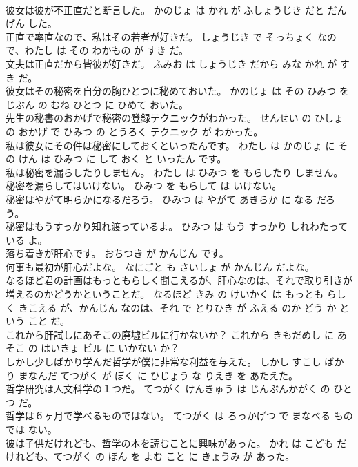 \documentclass[8pt]{extreport}
\begin{document}
\begin{CJK}{UTF8}{min}
\\	彼女は彼が不正直だと断言した。	かのじょ は かれ が ふしょうじき だと だんげん した。	
\\	正直で率直なので、私はその若者が好きだ。	しょうじき で そっちょく なので、わたし は その わかもの が すき だ。	
\\	文夫は正直だから皆彼が好きだ。	ふみお は しょうじき だから みな かれ が すき だ。	
\\	彼女はその秘密を自分の胸ひとつに秘めておいた。	かのじょ は その ひみつ を じぶん の むね ひとつ に ひめて おいた。	
\\	先生の秘書のおかげで秘密の登録テクニックがわかった。	せんせい の ひしょ の おかげ で ひみつ の とうろく テクニック が わかった。	
\\	私は彼女にその件は秘密にしておくといったんです。	わたし は かのじょ に その けん は ひみつ に して おく と いったん です。	
\\	私は秘密を漏らしたりしません。	わたし は ひみつ を もらしたり しません。	
\\	秘密を漏らしてはいけない。	ひみつ を もらして は いけない。	
\\	秘密はやがて明らかになるだろう。	ひみつ は やがて あきらか に なる だろう。	
\\	秘密はもうすっかり知れ渡っているよ。	ひみつ は もう すっかり しれわたっている よ。	
\\	落ち着きが肝心です。	おちつき が かんじん です。	
\\	何事も最初が肝心だよな。	なにごと も さいしょ が かんじん だよな。	
\\	なるほど君の計画はもっともらしく聞こえるが、肝心なのは、それで取り引きが増えるのかどうかということだ。	なるほど きみ の けいかく は もっとも らしく きこえる が、かんじん なのは、それ で とりひき が ふえる のか どう か という こと だ。	
\\	これから肝試しにあそこの廃墟ビルに行かないか？	これから きもだめし に あそこ の はいきょ ビル に いかない か？	
\\	しかし少しばかり学んだ哲学が僕に非常な利益を与えた。	しかし すこし ばかり まなんだ てつがく が ぼく に ひじょう な りえき を あたえた。	
\\	哲学研究は人文科学の１つだ。	てつがく けんきゅう は じんぶんかがく の ひとつ だ。	
\\	哲学は６ヶ月で学べるものではない。	てつがく は ろっかげつ で まなべる もの では ない。	
\\	彼は子供だけれども、哲学の本を読むことに興味があった。	かれ は こども だ けれども、てつがく の ほん を よむ こと に きょうみ が あった。	

\end{CJK}
\end{document}
